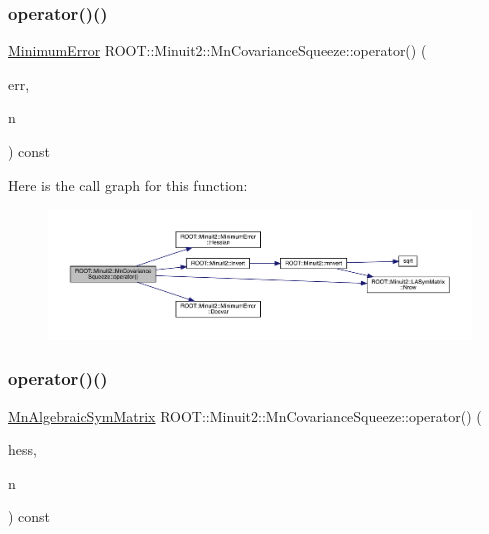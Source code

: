 \mbox{\label{classROOT_1_1Minuit2_1_1MnCovarianceSqueeze_a6f1ea9726d0981faacf7ee0c26326bcd}} 
\subsubsection{\texorpdfstring{operator()()}{operator()()}\hspace{0.1cm}{\footnotesize\ttfamily [4/6]}}
{\footnotesize\ttfamily \mbox{\hyperlink{classROOT_1_1Minuit2_1_1MinimumError}{Minimum\+Error}} R\+O\+O\+T\+::\+Minuit2\+::\+Mn\+Covariance\+Squeeze\+::operator() (\begin{DoxyParamCaption}\item[{const \mbox{\hyperlink{classROOT_1_1Minuit2_1_1MinimumError}{Minimum\+Error}} \&}]{err,  }\item[{unsigned int}]{n }\end{DoxyParamCaption}) const}

Here is the call graph for this function\+:\nopagebreak
\begin{figure}[H]
\begin{center}
\leavevmode
\includegraphics[width=350pt]{dc/d44/classROOT_1_1Minuit2_1_1MnCovarianceSqueeze_a6f1ea9726d0981faacf7ee0c26326bcd_cgraph}
\end{center}
\end{figure}
\mbox{\label{classROOT_1_1Minuit2_1_1MnCovarianceSqueeze_a3271676361fc2c88dad2037f40479fab}} 
\subsubsection{\texorpdfstring{operator()()}{operator()()}\hspace{0.1cm}{\footnotesize\ttfamily [5/6]}}
{\footnotesize\ttfamily \mbox{\hyperlink{namespaceROOT_1_1Minuit2_a9e74ad97f5537a2e80e52b04d98ecc6e}{Mn\+Algebraic\+Sym\+Matrix}} R\+O\+O\+T\+::\+Minuit2\+::\+Mn\+Covariance\+Squeeze\+::operator() (\begin{DoxyParamCaption}\item[{const \mbox{\hyperlink{namespaceROOT_1_1Minuit2_a9e74ad97f5537a2e80e52b04d98ecc6e}{Mn\+Algebraic\+Sym\+Matrix}} \&}]{hess,  }\item[{unsigned int}]{n }\end{DoxyParamCaption}) const}

